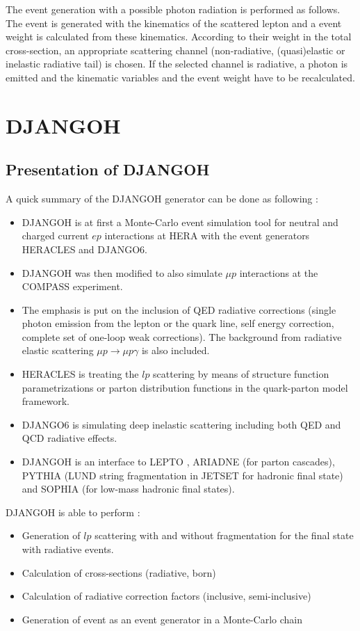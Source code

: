 The event generation with a possible photon radiation is performed as follows. The event is generated with the kinematics of the scattered lepton and a event weight is calculated from these kinematics. According to their weight in the total cross-section, an appropriate scattering channel (non-radiative, (quasi)elastic or inelastic radiative tail) is chosen. If the selected channel is radiative, a photon is emitted and the kinematic variables and the event weight have to be recalculated.


\section{DJANGOH}

\subsection{Presentation of DJANGOH}
A quick summary of the DJANGOH generator can be done as following :
\begin{itemize}
\item DJANGOH \cite{DJANGOH} is at first a Monte-Carlo event simulation tool for neutral and charged current $ep$ interactions at HERA with the event generators HERACLES and DJANGO6.
\item DJANGOH was then modified to also simulate $\mu p$ interactions at the COMPASS experiment.
\item The emphasis is put on the inclusion of QED radiative corrections (single photon emission from the lepton or the quark line, self energy correction, complete set of one-loop weak corrections). The background from radiative elastic scattering $\mu p\rightarrow \mu p\gamma$ is also included.
\item HERACLES is treating the $lp$ scattering by means of structure function parametrizations or parton distribution functions in the quark-parton model framework.
\item DJANGO6 is simulating deep inelastic scattering including both QED and QCD radiative effects.
\item DJANGOH is an interface to LEPTO \cite{LEPTO}, ARIADNE \cite{ARIADNE} (for parton cascades), PYTHIA \cite{PYTHIA6} (LUND string fragmentation in JETSET \cite{JETSET} for hadronic final state) and SOPHIA \cite{SOPHIA} (for low-mass hadronic final states).
\end{itemize}
DJANGOH is able to perform :
\begin{itemize}
\item Generation of $lp$ scattering with and without fragmentation for the final state with radiative events.
\item Calculation of cross-sections (radiative, born)
\item Calculation of radiative correction factors (inclusive, semi-inclusive)
\item Generation of event as an event generator in a Monte-Carlo chain
\end{itemize}

